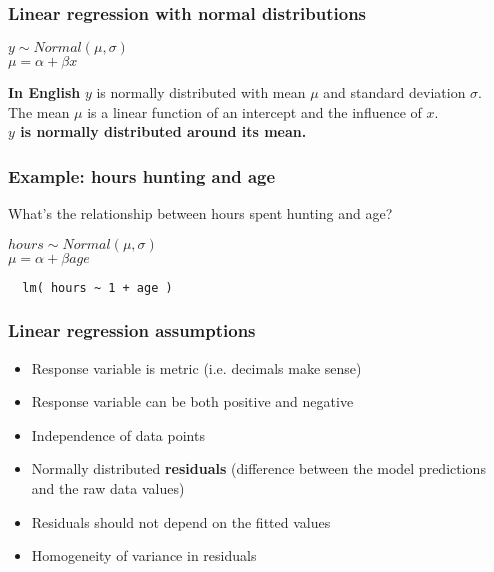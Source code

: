 \documentclass{beamer}
\begin{document}
\begin{frame}
  \frametitle{Linear regression with normal distributions}
  \centering
  $y \sim Normal(\mu,\sigma)$ \\\vspace{0.5cm}
  $\mu = \alpha + \beta x$\vspace{1cm}
  \begin{block}{\textbf{In English}}
  $y$ is normally distributed with mean $\mu$ and standard deviation $\sigma$.\\ \vspace{0.5cm}
  The mean $\mu$ is a linear function of an intercept and the influence of $x$.\\ \vspace{0.5cm}
  \textbf{$y$ is normally distributed around its mean.}
\end{block}
\end{frame}
\begin{frame}[fragile]
  \frametitle{Example: hours hunting and age}
  What's the relationship between hours spent hunting and age? \\ \vspace{1cm}
  \begin{centering}
    $hours \sim Normal(\mu, \sigma)$ \\\vspace{0.5cm}
    $\mu = \alpha + \beta age$ \\\vspace{0.5cm}
  \end{centering}%

  \begin{lstlisting}
  lm( hours ~ 1 + age )
\end{lstlisting}

\end{frame}
\begin{frame}
  \frametitle{Linear regression assumptions}
  \begin{itemize}
    \item<1-> Response variable is metric (i.e. decimals make sense)
    \item<2-> Response variable can be both positive and negative
    \item<3-> Independence of data points
    \item<4-> Normally distributed \alert{\textbf{residuals}} (difference between the model predictions and the raw data values)
    \item<5-> Residuals should not depend on the fitted values
    \item<6> Homogeneity of variance in residuals
  \end{itemize}
\end{frame}
\end{document}

